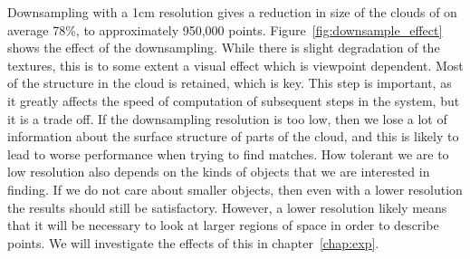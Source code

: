 \documentclass[11pt,a4paper]{kth-mag}
\begin{document}
Downsampling with a 1cm resolution gives a reduction in size of the clouds of on
average 78\%, to approximately 950,000 points.
Figure~\ref{fig:downsample_effect} shows the effect of the downsampling. While
there is slight degradation of the textures, this is to some extent a visual
effect which is viewpoint dependent. Most of the structure in the cloud is
retained, which is key. This step is important, as it greatly affects the speed
of computation of subsequent steps in the system, but it is a trade off. If the
downsampling resolution is too low, then we lose a lot of information about the
surface structure of parts of the cloud, and this is likely to lead to worse
performance when trying to find matches. How tolerant we are to low resolution
also depends on the kinds of objects that we are interested in finding. If we do
not care about smaller objects, then even with a lower resolution the results
should still be satisfactory. However, a lower resolution likely means that it
will be necessary to look at larger regions of space in order to describe
points. We will investigate the effects of this in chapter~\ref{chap:exp}.
\end{document}
